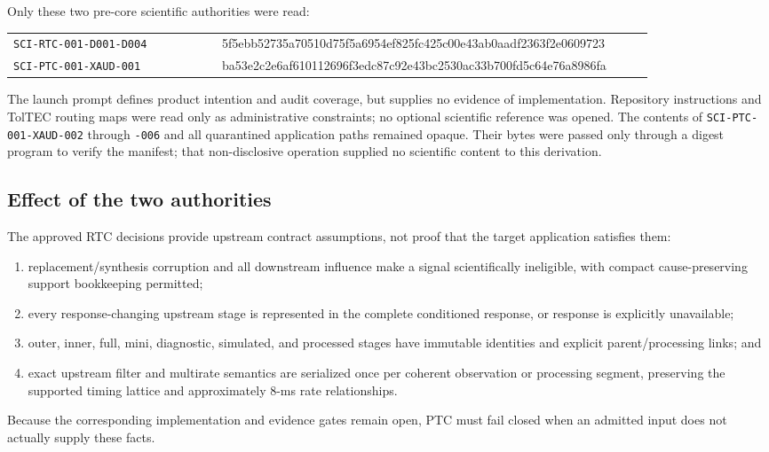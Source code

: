 \documentclass[11pt]{article}
\begin{document}
Only these two pre-core scientific authorities were read:
\begin{longtable}{>{\raggedright\arraybackslash}p{0.30\linewidth}
                  >{\raggedright\arraybackslash}p{0.62\linewidth}}
\texttt{SCI-RTC-001-D001-D004} &
{\scriptsize\ttfamily 5f5ebb52735a70510d75f5a6954ef825fc425c00e43ab0aadf2363f2e0609723}\\
\texttt{SCI-PTC-001-XAUD-001} &
{\scriptsize\ttfamily ba53e2c2e6af610112696f3edc87c92e43bc2530ac33b700fd5c64e76a8986fa}\\
\end{longtable}
The launch prompt defines product intention and audit coverage, but supplies
no evidence of implementation.  Repository instructions and TolTEC routing
maps were read only as administrative constraints; no optional scientific
reference was opened.  The contents of \texttt{SCI-PTC-001-XAUD-002} through
\texttt{-006} and all quarantined application paths remained opaque.  Their
bytes were passed only through a digest program to verify the manifest; that
non-disclosive operation supplied no scientific content to this derivation.

\subsection{Effect of the two authorities}

The approved RTC decisions provide upstream contract assumptions, not proof
that the target application satisfies them:
\begin{enumerate}[label=\texttt{RTC-D00\arabic*},leftmargin=*]
  \item replacement/synthesis corruption and all downstream influence make a
  signal scientifically ineligible, with compact cause-preserving support
  bookkeeping permitted;
  \item every response-changing upstream stage is represented in the complete
  conditioned response, or response is explicitly unavailable;
  \item outer, inner, full, mini, diagnostic, simulated, and processed stages
  have immutable identities and explicit parent/processing links; and
  \item exact upstream filter and multirate semantics are serialized once per
  coherent observation or processing segment, preserving the supported timing
  lattice and approximately 8-ms rate relationships.
\end{enumerate}
Because the corresponding implementation and evidence gates remain open,
PTC must fail closed when an admitted input does not actually supply these
facts.
\end{document}
